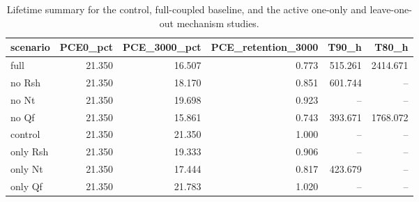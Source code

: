 \begin{table}[H]
\centering
\caption{Lifetime summary for the control, full-coupled baseline, and the active one-only and leave-one-out mechanism studies.}
\label{tab:comsol_lifetime_summary}
\small
\begin{tabular}{@{}lrrrrr@{}}
\toprule
scenario & PCE0\_pct & PCE\_3000\_pct & PCE\_retention\_3000 & T90\_h & T80\_h \\
\midrule
full & 21.350 & 16.507 & 0.773 & 515.261 & 2414.671 \\
no Rsh & 21.350 & 18.170 & 0.851 & 601.744 & -- \\
no Nt & 21.350 & 19.698 & 0.923 & -- & -- \\
no Qf & 21.350 & 15.861 & 0.743 & 393.671 & 1768.072 \\
control & 21.350 & 21.350 & 1.000 & -- & -- \\
only Rsh & 21.350 & 19.333 & 0.906 & -- & -- \\
only Nt & 21.350 & 17.444 & 0.817 & 423.679 & -- \\
only Qf & 21.350 & 21.783 & 1.020 & -- & -- \\
\bottomrule
\end{tabular}
\end{table}
